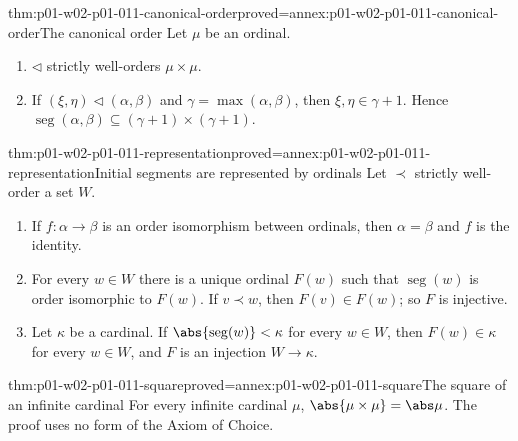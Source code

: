 \begin{hblemma}{thm:p01-w02-p01-011-canonical-order}{proved=annex:p01-w02-p01-011-canonical-order}{The canonical order}
Let \(\mu\) be an ordinal.
\begin{enumerate}
  \item \(\lhd\) strictly well-orders \(\mu\times\mu\).
  \item If \((\xi,\eta)\lhd(\alpha,\beta)\) and
        \(\gamma=\max(\alpha,\beta)\), then \(\xi,\eta\in\gamma+1\). Hence
        \(\operatorname{seg}(\alpha,\beta)\subseteq(\gamma+1)\times(\gamma+1)\).
\end{enumerate}
\end{hblemma}

\begin{hblemma}{thm:p01-w02-p01-011-representation}{proved=annex:p01-w02-p01-011-representation}{Initial segments are represented by ordinals}
Let \(\prec\) strictly well-order a set \(W\).
\begin{enumerate}
  \item If \(f:\alpha\to\beta\) is an order isomorphism between ordinals,
        then \(\alpha=\beta\) and \(f\) is the identity.
  \item For every \(w\in W\) there is a unique ordinal \(F(w)\) such that
        \(\operatorname{seg}(w)\) is order isomorphic to \(F(w)\). If
        \(v\prec w\), then \(F(v)\in F(w)\); so \(F\) is injective.
  \item Let \(\kappa\) be a cardinal. If
        \(\abs{\operatorname{seg}(w)}<\kappa\) for every \(w\in W\), then
        \(F(w)\in\kappa\) for every \(w\in W\), and \(F\) is an injection
        \(W\to\kappa\).
\end{enumerate}
\end{hblemma}

\begin{hbtheorem}{thm:p01-w02-p01-011-square}{proved=annex:p01-w02-p01-011-square}{The square of an infinite cardinal}
For every infinite cardinal \(\mu\), \(\abs{\mu\times\mu}=\abs\mu\). The
proof uses no form of the Axiom of Choice.
\end{hbtheorem}

